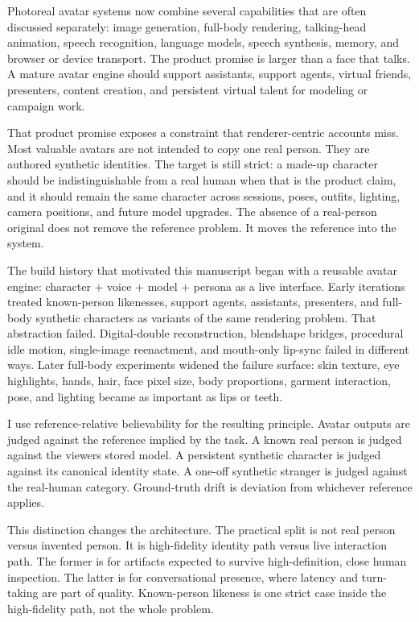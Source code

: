 \documentclass[
]{article}
\begin{document}
Photoreal avatar systems now combine several capabilities that are often
discussed separately: image generation, full-body rendering,
talking-head animation, speech recognition, language models, speech
synthesis, memory, and browser or device transport. The product promise
is larger than a face that talks. A mature avatar engine should support
assistants, support agents, virtual friends, presenters, content
creation, and persistent virtual talent for modeling or campaign work.

That product promise exposes a constraint that renderer-centric accounts
miss. Most valuable avatars are not intended to copy one real person.
They are authored synthetic identities. The target is still strict: a
made-up character should be indistinguishable from a real human when
that is the product claim, and it should remain the same character
across sessions, poses, outfits, lighting, camera positions, and future
model upgrades. The absence of a real-person original does not remove
the reference problem. It moves the reference into the system.

The build history that motivated this manuscript began with a reusable
avatar engine: character + voice + model + persona as a live interface.
Early iterations treated known-person likenesses, support agents,
assistants, presenters, and full-body synthetic characters as variants
of the same rendering problem. That abstraction failed. Digital-double
reconstruction, blendshape bridges, procedural idle motion, single-image
reenactment, and mouth-only lip-sync failed in different ways. Later
full-body experiments widened the failure surface: skin texture, eye
highlights, hands, hair, face pixel size, body proportions, garment
interaction, pose, and lighting became as important as lips or teeth.

I use reference-relative believability for the resulting principle.
Avatar outputs are judged against the reference implied by the task. A
known real person is judged against the viewer\textquotesingle s stored
model. A persistent synthetic character is judged against its canonical
identity state. A one-off synthetic stranger is judged against the
real-human category. Ground-truth drift is deviation from whichever
reference applies.

This distinction changes the architecture. The practical split is not
real person versus invented person. It is high-fidelity identity path
versus live interaction path. The former is for artifacts expected to
survive high-definition, close human inspection. The latter is for
conversational presence, where latency and turn-taking are part of
quality. Known-person likeness is one strict case inside the
high-fidelity path, not the whole problem.
\end{document}
